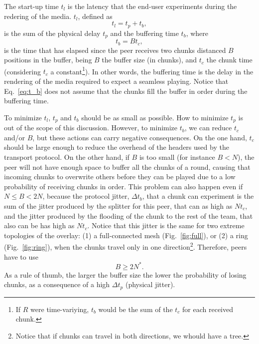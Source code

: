 

\label{sec:latency}


The start-up time $t_l$ is the latency that the end-user experiments
during the redering of the media. $t_l$, defined as
\begin{equation}
  \label{eq:t_l}
  t_l = t_p + t_b,
\end{equation}
is the sum of the physical
delay $t_p$ and the buffering time $t_b$, where
\begin{equation}
  \label{eq:t_b}
  t_b = Bt_c,
\end{equation}
is the time that has elapsed since the peer receives two chunks
distanced $B$ positions in the buffer, being $B$ the buffer size (in
chunks), and $t_c$ the chunk time (considering $t_c$ a
constant\footnote{If $R$ were time-variying, $t_b$ would be the sum of
  the $t_c$ for each received chunk.}). In other words, the buffering
time is the delay in the rendering of the media required to expect a
seamless playing. Notice that Eq.~\ref{eq:t_b} does not assume that
the chunks fill the buffer in order during the buffering time.

To minimize $t_l$, $t_p$ and $t_b$ should be as small as possible. How
to minimize $t_p$ is out of the scope of this discussion. However, to
minimize $t_b$, we can reduce $t_c$ and/or $B$, but these actions can
carry negative consequences. On the one hand, $t_c$ should be large
enough to reduce the overhead of the headers used by the transport
protocol. On the other hand, if $B$ is too small (for instance $B<N$),
the peer will not have enough space to buffer all the chunks of a
round, causing that incoming chunks to overwrite others before they
can be played due to a low probability of receiving chunks in
order. This problem can also happen even if $N\leq B<2N$, because the
protocol jitter, $\Delta t_b$, that a chunk can experiment is the sum
of the jitter produced by the splitter for this peer, that can as high
as $Nt_c$, and the jitter produced by the flooding of the chunk to the
rest of the team, that also can be has high as $Nt_c$. Notice that
this jitter is the same for two extreme topologies of the overlay: (1)
a full-connected mesh (Fig.~\ref{fig:full}), or (2) a ring
(Fig.~\ref{fig:ring}), when the chunks travel only in one
direction\footnote{Notice that if chunks can travel in both
  directions, we whould have a tree.}. Therefore, peers have to use
\begin{equation}
  \label{eq:minimum_B}
  B\ge 2N^*.
\end{equation}
As a rule of thumb, the larger the buffer size the lower the
probability of losing chunks, as a consequence of a high $\Delta t_p$
(physical jitter).

